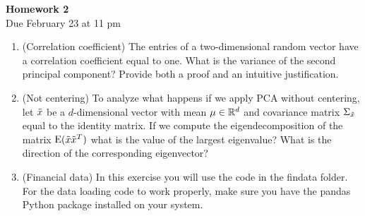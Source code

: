 \documentclass[12pt,twoside]{article}
\begin{document}
\begin{center}
{\large{\textbf{Homework 2}} } \vspace{0.2cm}\\
Due February 23 at 11 pm
\end{center}

\begin{enumerate}
\item (Correlation coefficient) The entries of a two-dimensional random vector have a correlation coefficient equal to one. What is the variance of the second principal component? Provide both a proof and an intuitive justification. 

\item (Not centering) To analyze what happens if we apply PCA without centering, let $\tilde{  x }$ be a $d$-dimensional vector with mean $\mu \in \mathbb{R}^{d}$ and covariance matrix $\Sigma_{\tilde{  x }}$ equal to the identity matrix. If we compute the eigendecomposition of the matrix $\mathrm{E}(\tilde{  x } \tilde{  x }^T)$ what is the value of the largest eigenvalue? What is the direction of the corresponding eigenvector? 
  
 \item (Financial data) In this exercise you will use the code in the findata folder.
  For the data loading code to work properly, make sure you
  have the pandas Python package installed on your system.


\end{enumerate}
\end{document}

